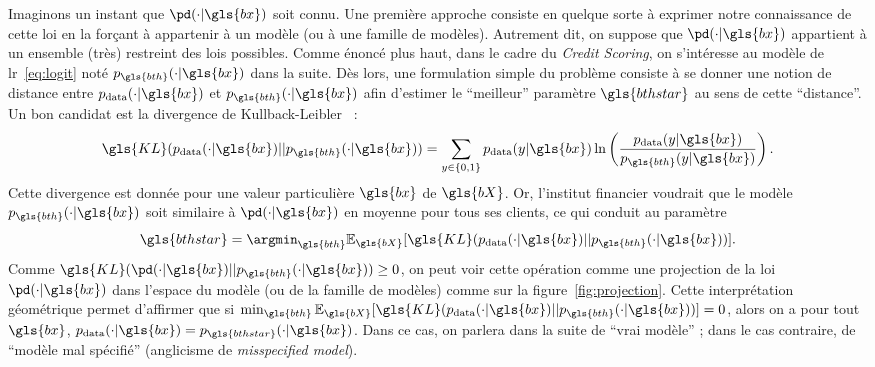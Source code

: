 Imaginons un instant que $\pd(\cdot | \gls{bx})$ soit connu. Une première approche consiste en quelque sorte à exprimer notre connaissance de cette loi en la forçant à appartenir à un modèle (ou à une famille de modèles). Autrement dit, on suppose que $\pd(\cdot | \gls{bx})$ appartient à un ensemble (très) restreint des lois possibles. 
Comme énoncé plus haut, dans le cadre du \textit{Credit Scoring}, on s'intéresse au modèle de \gls{lr}~\eqref{eq:logit} noté $p_{\gls{bth}}(\cdot | \gls{bx})$ dans la suite. Dès lors, une formulation simple du problème consiste à se donner une notion de distance entre $p_{\text{data}}(\cdot | \gls{bx})$ et $p_{\gls{bth}}(\cdot | \gls{bx})$ afin d'estimer le ``meilleur'' paramètre $\gls{bthstar}$ au sens de cette ``distance''. Un bon candidat est la divergence de Kullback-Leibler~\cite{kullback1951information} :
\begin{equation} \label{eq:KL}
\gls{KL}(p_{\text{data}}(\cdot | \gls{bx})||p_{\gls{bth}}(\cdot | \gls{bx})) = \sum_{y \in \{0,1\}} p_{\text{data}}(y | \gls{bx}) \ln \left( \frac{p_{\text{data}}(y | \gls{bx})}{p_{\gls{bth}}(y | \gls{bx})} \right).
\end{equation}
Cette divergence est donnée pour une valeur particulière $\gls{bx}$ de $\gls{bX}$. Or, l'institut financier voudrait que le modèle $p_{\gls{bth}}(\cdot | \gls{bx})$ soit similaire à $\pd(\cdot | \gls{bx})$ en moyenne pour tous ses clients, ce qui conduit au paramètre $${\gls{bthstar}} = \argmin_{\gls{bth}} \mathbb{E}_{\gls{bX}} [\gls{KL}(p_{\text{data}}(\cdot | \gls{bx})||p_{\gls{bth}}(\cdot | \gls{bx}))].$$ Comme $\gls{KL}(\pd(\cdot | \gls{bx})||p_{\gls{bth}}(\cdot | \gls{bx})) \geq 0$, on peut voir cette opération comme une projection de la loi $\pd(\cdot | \gls{bx})$ dans l'espace du modèle (ou de la famille de modèles) comme sur la figure~\ref{fig:projection}. Cette interprétation géométrique permet d'affirmer que si $\min_{\gls{bth}} \mathbb{E}_{\gls{bX}} [\gls{KL}(p_{\text{data}}(\cdot | \gls{bx})||p_{\gls{bth}}(\cdot | \gls{bx}))] = 0$, alors on a pour tout $\gls{bx}$, $p_{\text{data}}(\cdot | \gls{bx}) = p_{\gls{bthstar}}(\cdot | \gls{bx})$. Dans ce cas, on parlera dans la suite de ``vrai modèle'' ; dans le cas contraire, de ``modèle mal spécifié'' (anglicisme de \textit{misspecified model}).


